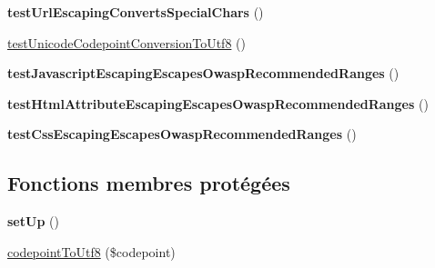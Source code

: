 \begin{DoxyCompactItemize}
\item 
{\bfseries test\+Url\+Escaping\+Converts\+Special\+Chars} ()\hypertarget{class_twig___test___escaping_test_a88b0f08c49e4cf8b416bf64deafbf701}{}\label{class_twig___test___escaping_test_a88b0f08c49e4cf8b416bf64deafbf701}

\item 
\hyperlink{class_twig___test___escaping_test_afd286f41b529742b365518e49c658244}{test\+Unicode\+Codepoint\+Conversion\+To\+Utf8} ()
\item 
{\bfseries test\+Javascript\+Escaping\+Escapes\+Owasp\+Recommended\+Ranges} ()\hypertarget{class_twig___test___escaping_test_a30e2d2e60383288f811fafa86d8b424f}{}\label{class_twig___test___escaping_test_a30e2d2e60383288f811fafa86d8b424f}

\item 
{\bfseries test\+Html\+Attribute\+Escaping\+Escapes\+Owasp\+Recommended\+Ranges} ()\hypertarget{class_twig___test___escaping_test_a5db932ec37b487bd11e36a5343f1a6e7}{}\label{class_twig___test___escaping_test_a5db932ec37b487bd11e36a5343f1a6e7}

\item 
{\bfseries test\+Css\+Escaping\+Escapes\+Owasp\+Recommended\+Ranges} ()\hypertarget{class_twig___test___escaping_test_a76108f2edca1433632757cb2a1a80f09}{}\label{class_twig___test___escaping_test_a76108f2edca1433632757cb2a1a80f09}

\end{DoxyCompactItemize}
\subsection*{Fonctions membres protégées}
\begin{DoxyCompactItemize}
\item 
{\bfseries set\+Up} ()\hypertarget{class_twig___test___escaping_test_a0bc688732d2b3b162ffebaf7812e78da}{}\label{class_twig___test___escaping_test_a0bc688732d2b3b162ffebaf7812e78da}

\item 
\hyperlink{class_twig___test___escaping_test_a435825fa4c7776922a73ef292ee58d02}{codepoint\+To\+Utf8} (\$codepoint)
\end{DoxyCompactItemize}
